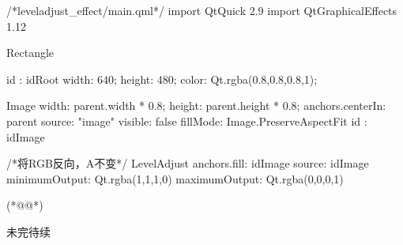 \label{f000059}    %
\FloatBarrier                                  %
\begin{thebookfilesourceone}[escapeinside={(*@}{@*)},
caption=GoodLuck,
title=\filesourcenumbernameone \thefilesourcenumber
]
/*leveladjust_effect/main.qml*/
import QtQuick 2.9
import QtGraphicalEffects 1.12

Rectangle {
    id : idRoot
    width: 640;
    height: 480;
    color: Qt.rgba(0.8,0.8,0.8,1);

    Image{
        width: parent.width * 0.8;
        height: parent.height * 0.8;
        anchors.centerIn: parent
        source: "image"
        visible: false
        fillMode: Image.PreserveAspectFit
        id : idImage
    }

    /*将RGB反向，A不变*/
    LevelAdjust {
        anchors.fill: idImage
        source: idImage
        minimumOutput: Qt.rgba(1,1,1,0)
        maximumOutput: Qt.rgba(0,0,0,1)
    }

}(*@\marginpar[\hfill\setlength\fboxsep{2pt}\fbox{\footnotesize{\kaishu\parbox{1em}{\setlength{\baselineskip}{2pt}\filesourcenumbernameone}}\footnotesize{\thefilesourcenumber}}]{\setlength\fboxsep{2pt}\fbox{\footnotesize{\kaishu\parbox{1em}{\setlength{\baselineskip}{2pt}\filesourcenumbernameone}}\footnotesize{\thefilesourcenumber}}}@*)\end{thebookfilesourceone}          %
\addtocounter{lstlisting}{-1}   %


未完待续









